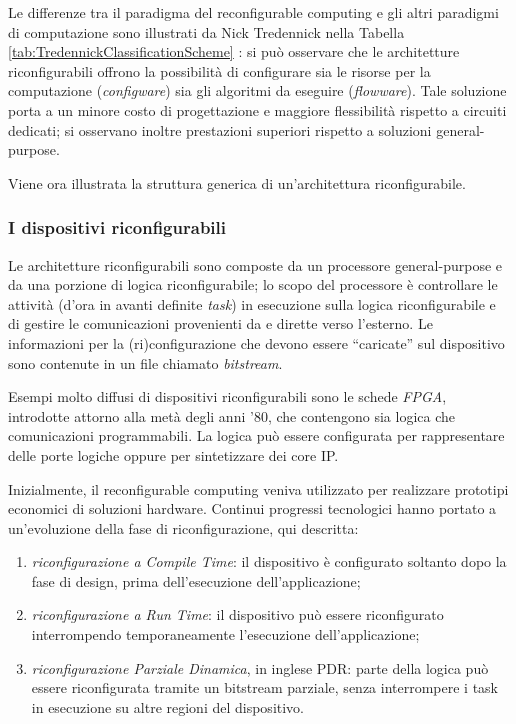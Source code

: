 Le differenze tra il paradigma del reconfigurable computing e gli altri paradigmi di
computazione sono illustrati da Nick Tredennick nella Tabella
\ref{tab:TredennickClassificationScheme} \cite{TredennickClassification}: si può
osservare che le architetture riconfigurabili offrono la possibilità di configurare sia le
risorse per la computazione (\emph{configware}) sia gli algoritmi da eseguire
(\emph{flowware}). Tale soluzione porta a un minore costo di progettazione e
maggiore flessibilità rispetto a circuiti dedicati; si osservano inoltre prestazioni
superiori rispetto a soluzioni general-purpose.

Viene ora illustrata la struttura generica di un'architettura riconfigurabile.

\subsubsection{I dispositivi riconfigurabili}
Le architetture riconfigurabili sono composte da un processore general-purpose e da una
porzione di logica riconfigurabile; lo scopo del processore è controllare le
attività (d'ora in avanti definite \emph{task}) in esecuzione sulla logica
riconfigurabile e di gestire le comunicazioni provenienti da e dirette verso l'esterno.
Le informazioni per la (ri)configurazione che devono essere ``caricate'' sul dispositivo
sono contenute in un file chiamato \emph{bitstream}.


Esempi molto diffusi di dispositivi riconfigurabili sono le schede \emph{\ac{FPGA}},
introdotte attorno alla metà degli anni '80, che contengono sia logica che comunicazioni
programmabili. La logica può essere configurata per rappresentare delle porte logiche
oppure per sintetizzare dei core \ac{IP}.

Inizialmente, il reconfigurable computing veniva utilizzato per realizzare prototipi
economici di soluzioni hardware. Continui progressi tecnologici hanno portato
a un'evoluzione della fase di riconfigurazione, qui descritta:
\begin{enumerate}
 \item \emph{riconfigurazione a Compile Time}: il dispositivo è configurato soltanto
dopo la fase di design, prima dell'esecuzione dell'applicazione;
 \item \emph{riconfigurazione a Run Time}: il dispositivo può essere riconfigurato
interrompendo temporaneamente l'esecuzione dell'applicazione;
 \item \emph{riconfigurazione Parziale Dinamica}, in inglese \ac{PDR}: parte della logica
può essere riconfigurata tramite un bitstream parziale, senza interrompere i task in
esecuzione su altre regioni del dispositivo.
\end{enumerate}

